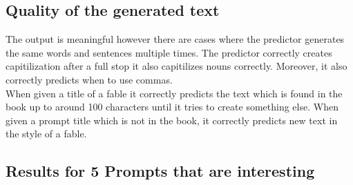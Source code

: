 \documentclass{article}
\begin{document}
\subsection{Quality of the generated text}
The output is meaningful however there are cases where the predictor generates the same words and sentences multiple times. The predictor correctly creates capitilization after a full stop it also capitilizes nouns correctly. Moreover, it also correctly predicts when to use commas.\\
When given a title of a fable it correctly predicts the text which is found in the book up to around 100 characters until it tries to create something else. When given a prompt title which is not in the book, it correctly predicts new text in the style of a fable.
\clearpage
\subsection{Results for 5 Prompts that are interesting}
\end{document}
